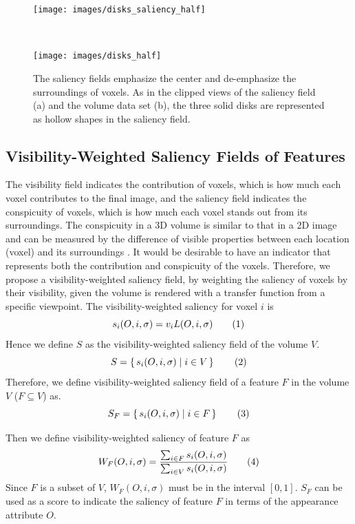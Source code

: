 \begin{figure}
	\centering
	\begin{minipage}{.4\textwidth}
		\texttt{[image: images/disks\_saliency\_half]}
		\subcaption{}
	\end{minipage}~
	\begin{minipage}{.4\textwidth}
		\texttt{[image: images/disks\_half]}
		\subcaption{}
	\end{minipage}
	\caption{The saliency fields emphasize the center and de-emphasize the surroundings of voxels. As in the clipped views of the saliency field (a) and the volume data set (b), the three solid disks are represented as hollow shapes in the saliency field.}
	\label{fig:disks_saliency_half}
\end{figure}

\subsection{Visibility-Weighted Saliency Fields of Features \label{visibility_weighted_saliency}}
The visibility field indicates the contribution of voxels, which is how much each voxel contributes to the final image, and the saliency field indicates the conspicuity of voxels, which is how much each voxel stands out from its surroundings.
The conspicuity in a 3D volume is similar to that in a 2D image and can be measured by the difference of visible properties between each location (voxel) and its surroundings \cite{duan_visual_2011}.
It would be desirable to have an indicator that represents both the contribution and conspicuity of the voxels.
Therefore, we propose a visibility-weighted saliency field, by weighting the saliency of voxels by their visibility, given the volume is rendered with a transfer function from a specific viewpoint.
The visibility-weighted saliency for voxel $ i $ is
\[ s_{i}(O,i,\sigma)= v_{i} L(O,i,\sigma)
\addtag \]
Hence we define $ S $ as the visibility-weighted saliency field of the volume $ V $.
\[ S=\set{s_{i}(O,i,\sigma)|i \in V} 
\addtag \]
Therefore, we define visibility-weighted saliency field of a feature $ F $ in the volume $ V $ ($ F\subseteq V $) as.
\[ S_{F}=\set{s_{i}(O,i,\sigma)|i \in F} 
\addtag \]

Then we define visibility-weighted saliency of feature $ F $ as
\[ W_{F}(O,i,\sigma)=\frac{\sum_{i \in F}{s_{i}(O,i,\sigma)}}{\sum_{i \in V}{s_{i}(O,i,\sigma)}} 
\addtag \]
Since $ F $ is a subset of $ V $, $ W_{F}(O,i,\sigma) $ must be in the interval $ [0,1] $.
$ S_{F} $ can be used as a score to indicate the saliency of feature $ F $ in terms of the appearance attribute $ O $.

